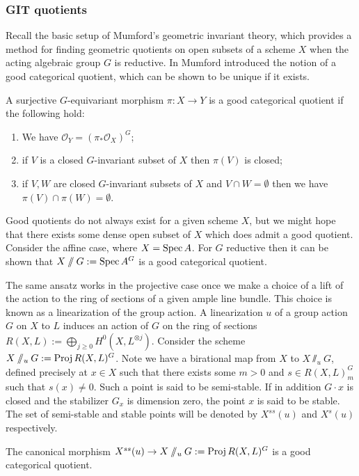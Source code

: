 \subsubsection{GIT quotients}
Recall the basic setup of Mumford's geometric invariant theory, which provides a method for finding geometric quotients on open subsets of a scheme \(X\) when the acting algebraic group \(G\) is reductive.
%
%
%
In \cite{mumford1994} Mumford introduced the notion of a good categorical quotient, which can be shown to be unique if it exists.
%
%
%
\begin{definition}
A surjective \(G\)-equivariant morphism \(\pi : X \to Y\) is a good categorical quotient if the following hold:
\begin{enumerate}
\item We have \(\mathcal{O}_Y = (\pi_* \mathcal{O}_X)^G\);
\item if \(V\) is a closed \(G\)-invariant subset of \(X\) then \(\pi(V)\) is closed;
\item if \(V,W\) are closed \(G\)-invariant subsets of \(X\) and \(V \cap W = \emptyset\) then we have \(\pi(V) \cap \pi(W) = \emptyset\).
\end{enumerate}
\end{definition}
%
%
%
Good quotients do not always exist for a given scheme \(X\), but we might hope that there exists some dense open subset of \(X\) which does admit a good quotient. Consider the affine case, where \(X = \operatorname{Spec} A\). For \(G\) reductive then it can be shown that \(X \sslash G : = \operatorname{Spec} A^G\) is a good categorical quotient.

The same ansatz works in the projective case once we make a choice of a lift of the action to the ring of sections of a given ample line bundle. This choice is known as a linearization of the group action.
%
%
%
%
%
%
A linearization \(u\) of a group action \(G\) on \(X\) to \(L\) induces an action of \(G\) on the ring of sections \(R(X,L) := \bigoplus_{j \ge 0} H^0(X,L^{\otimes j}) \). Consider the scheme \(X \sslash_u G := \operatorname{Proj} R(X,L)^G\). Note we have a birational map from \(X\) to \(X \sslash_u G\), defined precisely at \(x \in X\) such that there exists some \(m> 0 \) and \(s \in R(X,L)^G_m\) such that \(s(x) \neq 0\). Such a point is said to be semi-stable. If in addition \(G \cdot x\) is closed and the stabilizer \(G_x\) is dimension zero, the point \(x\) is said to be stable. The set of semi-stable and stable points will be denoted by \(X^{ss}(u)\) and \(X^{s}(u)\) respectively.
%
%
%
\begin{lemma}
The canonical morphism \(X^{ss}(u) \to X\sslash_u G := \operatorname{Proj} R(X,L)^G \) is a good categorical quotient.
\end{lemma}
